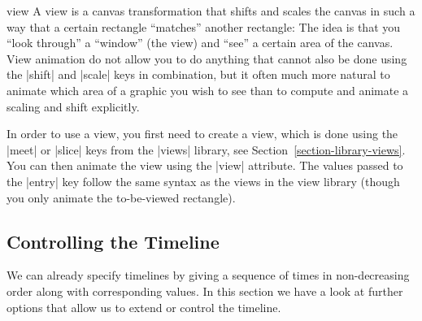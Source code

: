\begin{tikzanimateattribute}{view}
  A view is a canvas transformation that shifts and
  scales the canvas in such a way that a certain rectangle ``matches''
  another rectangle: The idea is that you ``look through'' a ``window''
  (the view) and ``see'' a certain area of the canvas. View animation do
  not allow you to do anything that cannot also be done using the
  |shift| and |scale| keys in combination, but it often much more
  natural to animate which area of a graphic you wish to see than to
  compute and animate a scaling and shift explicitly.
  
  In order to use a view, you first need to create a view, which is done
  using the |meet| or |slice| keys from the |views| library, see
  Section~\ref{section-library-views}. You can then animate the view
  using the |view| attribute. The values passed to the |entry| key
  follow the same syntax as the views in the view library (though you
  only animate the to-be-viewed rectangle).
  
\begin{codeexample}[animation list={0.5,1,1.5,2},animation bb={(1.1,-0.9) rectangle (2.9,0.9)}]
\end{codeexample}
\end{tikzanimateattribute}



\subsection{Controlling the Timeline}

\label{section-anim-timeline}

We can already specify timelines by giving a sequence of times in
non-decreasing order along with corresponding values. In this section
we have a look at further options that allow us to extend or control
the timeline.



